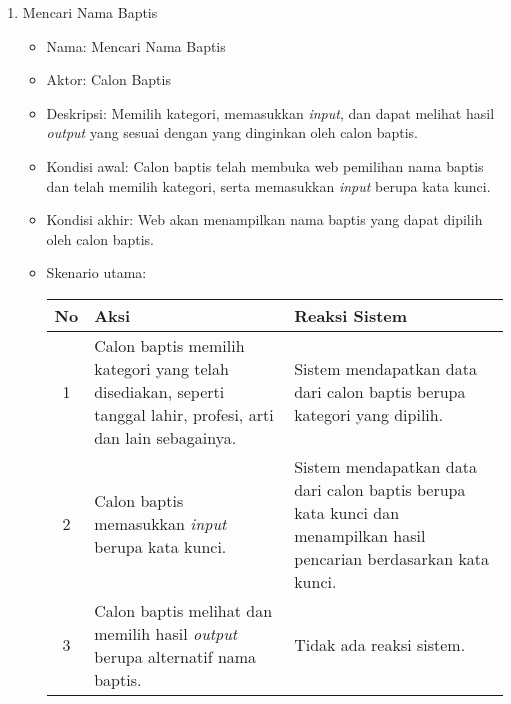 \documentclass[a4paper,twoside]{article}
\begin{document}
\begin{enumerate}
\begin{enumerate}
                       \begin{enumerate}
                        \item Mencari Nama Baptis
                                \begin{itemize}
                                        \item Nama: Mencari Nama Baptis
                                        \item Aktor: Calon Baptis
                                        \item Deskripsi: Memilih kategori, memasukkan \textit{input}, dan dapat melihat hasil \textit{output} yang sesuai dengan yang dinginkan oleh calon baptis.
                                        \item Kondisi awal: Calon baptis telah membuka web pemilihan nama baptis dan telah memilih kategori, serta memasukkan \textit{input} berupa kata kunci. %
                                        \item Kondisi akhir: Web akan menampilkan nama baptis yang dapat dipilih oleh calon baptis.%
                                        \item Skenario utama:														
				
				\begin{center}
  \begin{tabular}{ | c | p{6cm} |p{6cm} |}
    \hline
    No  & Aksi & Reaksi Sistem\\ \hline 
		1 & Calon baptis memilih kategori yang telah disediakan, 
		seperti tanggal lahir, profesi, arti dan lain sebagainya. %
		&  Sistem mendapatkan data dari calon baptis berupa kategori yang dipilih.\\ \hline 
		2 & Calon baptis memasukkan \textit{input} berupa kata kunci. & Sistem mendapatkan data dari calon baptis berupa kata kunci dan menampilkan hasil pencarian berdasarkan kata kunci.
		\\ \hline
		
		3 & Calon baptis melihat dan memilih hasil \textit{output} berupa alternatif nama baptis. & Tidak ada reaksi sistem.\\ \hline
		
    \end{tabular}
\end{center} 

                                \end{itemize}


\end{enumerate}
\end{enumerate}
\end{enumerate}
\end{document}
